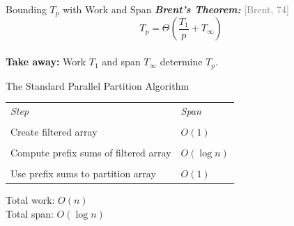 \documentclass[xcolor=x11names, svgnames, rgb]{beamer}
\newcommand{\defn}[1]       {{\textit{\textbf{\boldmath #1}}}}
\newtheorem{defin}{Definition}
\newcommand{\citefont}[1]{{\tiny \textcolor{Gray}{#1}}}
\begin{document}
\begin{frame}[t]{Bounding $T_p$ with Work and Span}
	\defn{Brent's Theorem:} \citefont{[Brent, 74]}
	$$T_p = \Theta\left(\frac{T_1}{p}+T_\infty\right)$$
	$ $\\ \vspace{1cm}
	\textbf{Take away:} Work $T_1$ and span $T_\infty$ determine $T_p$.
\end{frame}


\begin{frame}[t]{The Standard Parallel Partition Algorithm}
\begin{table}[]
\begin{tabular}{ll}
	\emph{Step}                                              & \emph{Span} \\\\
Create filtered array                             & $O(1)$            \\\\
Compute prefix sums of filtered array & $O(\log n)$       \\\\
Use prefix sums to partition array                & $O(1)$           
\end{tabular}
\end{table}
\vspace{10 mm}
Total work: $O(n)$\\
Total span: $O(\log n)$

\end{frame}

\end{document}
